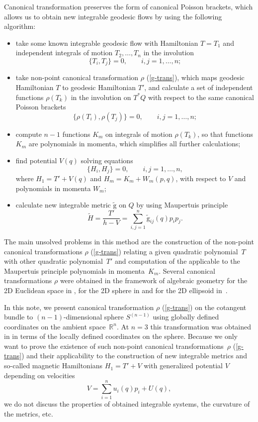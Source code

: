 \documentclass[10pt,a4paper]{amsart}
\numberwithin{equation}{section}
\begin{document}
Canonical transformation preserves the form of canonical Poisson brackets, which allows us to obtain new integrable geodesic flows by using the following algorithm:
\begin{itemize}\itemsep=0pt
 \item take some known integrable geodesic flow with Hamiltonian $T=T_1$ and independent integrals of motion $T_2,\dots,T_n$ in the involution
 \[\{T_i,T_j\}=0 ,\qquad i,j=1,\dots,n;\]
 \item take non-point canonical transformation $\rho$ (\ref{g-trans}), which maps geodesic Hamiltonian $T$ to geodesic Hamiltonian $T'$, and calculate a set of independent functions $\rho(T_k)$ in the involution on $T^*Q$ with respect to the same canonical Poisson brackets
 \[\{\rho(T_i),\rho(T_j)\}=0 ,\qquad i,j=1,\dots,n ;\]
 \item compute $n-1$ functions $K_m$ on integrals of motion $\rho(T_k)$, so that functions $K_m$ are polynomials in momenta, which simplifies all further calculations;
 \item find potential $V(q)$ solving equations
 \[\{H_i,H_j\}=0 ,\qquad i,j=1,\dots,n,\]
 where $H_1=T'+V(q)$ and $H_m=K_m+W_m(p,q)$, with respect to $V$ and polynomials in momenta $W_m$;
 \item calculate new integrable metric $\tilde{\mathrm g}$ on $Q$ by using Maupertuis principle
 \begin{equation}\label{mau-metr}
 \tilde{H}=\frac{T'}{h-V}=\sum_{i,j=1}^n \tilde{\mathrm g}_{ij}(q) p_ip_j .
 \end{equation}
\end{itemize}
The main unsolved problems in this method are the construction of the non-point canonical transformations $\rho$ (\ref{g-trans}) relating a given quadratic polynomial~$T$ with other quadratic polynomial~$T'$ and computation of the applicable to the Maupertuis principle polynomials in momenta~$K_m$.
Several canonical transformations $\rho$ were obtained in the framework of algebraic geometry for the 2D Euclidean space in \cite{ts15b,ts17,ts18d,ts18g}, for the 2D sphere in \cite{ts15,ts15a,ts17v,ts17c} and for the 2D ellipsoid in~\cite{ts17ell}.

In this note, we present canonical transformation $\rho$ (\ref{g-trans}) on the cotangent bundle to $(n-1)$-dimensional sphere $S^{(n-1)}$ using globally defined coordinates on the ambient space~${\mathbb R}^n$. At $n=3$ this transformation was obtained in \cite{ts17v,ts17c} in terms of the locally defined coordinates on the sphere.
Because we only want to prove the existence of such non-point canonical transformations~$\rho$ (\ref{g-trans}) and their applicability to the construction of new integrable metrics and so-called magnetic Hamiltonians $H_1=T'+V$ with generalized potential $V$ depending on velocities
\[V=\sum_{i=1}^n u_i(q)p_i+U(q) ,\]
we do not discuss the properties of obtained integrable systems, the curvature of the metrics, etc.
\end{document}
